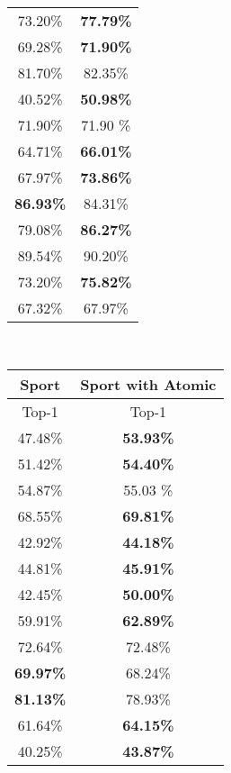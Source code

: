 \documentclass[10pt,twocolumn,letterpaper]{article}
\begin{document}
\begin{table*}[hbt!]
\begin{center}
{\begin{tabular}{c|c}
             73.20\% & \bf{77.79}\%  \\
             69.28\% & \bf{71.90}\%  \\
             81.70\% &     82.35\%   \\
            \hline
             40.52\% & \bf{50.98}\%  \\
             71.90\% &     71.90 \%  \\
             64.71\% & \bf{66.01}\%  \\
             67.97\% & \bf{73.86}\%  \\
            \hline
             \bf{86.93}\% & 84.31\%  \\
             79.08\% & \bf{86.27}\%  \\
             89.54\% & 90.20\%  \\
            \hline
             73.20\% & \bf{75.82}\%  \\
            \hline
             67.32\% & 67.97\%  \\
             \hline
        \end{tabular}
}
\endminipage
~~~~~
{\small 
        \begin{tabular}{c|c}
            \hline
            \multicolumn{1}{c|}{Sport} &
            \multicolumn{1}{c}{Sport with Atomic} \\
            \hline
            Top-1 & Top-1  \\
            \hline
             47.48\% & \bf{53.93}\%  \\
             51.42\% & \bf{54.40}\%  \\
             54.87\% &     55.03 \%  \\
             68.55\% & \bf{69.81}\%   \\
            \hline
             42.92\% & \bf{44.18}\%  \\
             44.81\% & \bf{45.91}\%  \\
             42.45\% & \bf{50.00}\%  \\
             59.91\% & \bf{62.89}\%  \\
            \hline
             72.64\% & 72.48\%  \\
             \bf{69.97}\% & 68.24\%  \\
             \bf{81.13}\% & 78.93\%  \\
            \hline
             61.64\% & \bf{64.15}\%  \\
            \hline
             40.25\% & \bf{43.87}\%  \\
             \hline
        \end{tabular}
}
\endminipage
\end{center}
\caption{ \textbf{Left}: HAA500 trained over different models. \textbf{Right}: Composite action classification accuracy of different models when they are trained with/without atomic action classification. Numbers are bolded when the difference is larger than 1\%. }
\vspace{-0.2in}
\label{table:Experiments}

\end{table*}
\vspace{-1em}
\end{document}
